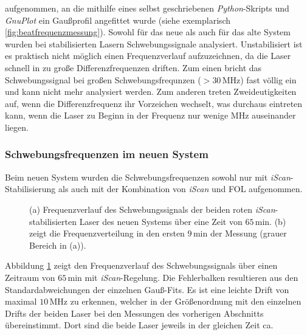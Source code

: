 aufgenommen, an die  mithilfe eines selbst geschriebenen \textit{Python}-Skripts
und \textit{GnuPlot} ein Gaußprofil angefittet wurde (siehe exemplarisch
\ref{fig:beatfrequenzmessung}).
Sowohl für das neue als auch für das alte System wurden bei stabilisierten
Lasern Schwebungssignale analysiert. Unstabilisiert ist es praktisch nicht
möglich einen Frequenzverlauf aufzuzeichnen, da die Laser schnell in zu
große Differenzfrequenzen driften. Zum einen bricht das Schwebungssignal
bei großen Schwebungsfrequnzen ($>30\,$MHz) fast völlig ein und kann nicht mehr
analysiert werden. Zum anderen treten Zweideutigkeiten auf, wenn die
Differenzfrequenz ihr Vorzeichen wechselt, was durchaus eintreten kann, wenn die
Laser zu Beginn in der Frequenz nur wenige MHz auseinander liegen.

\subsubsection{Schwebungsfrequenzen im neuen
System}\label{subsubsec:beatfrequenzmessung_neues_system}
Beim neuen System wurden die Schwebungsfrequenzen sowohl nur mit
\textit{iScan}-Stabilisierung als auch mit der Kombination von \textit{iScan}
und FOL aufgenommen.
\begin{figure}[hp]
 	\centering
 	\footnotesize
 	\fbox{\parbox{\dimexpr \linewidth - 2\fboxrule - 2\fboxsep}{
 	\subfloat[]{
		\label{subfig:beatfrequenzen_neu_iScan_drift}
		
		}\\
 	\subfloat[]{
		\label{subfig:beatfrequenzen_neu_iScan_histogramm}
		
		}
	}}
	\caption[Beatfrequenzen - neues System mit \textit{iScan}]{(a) Frequenzverlauf
	des Schwebungssignals der beiden roten \textit{iScan}-stabilisierten Laser des neuen Systems über eine Zeit von
	$65\,$min. (b) zeigt die Frequenzverteilung in den ersten $9\,$min der
	Messung (grauer Bereich in (a)).}
	\label{fig:beatfrequenzen_neu_iScan}
\end{figure}
Abbildung
\ref{fig:beatfrequenzen_neu_iScan} zeigt den Frequenzverlauf des Schwebungssignals über einen Zeitraum von $65\,$min mit
\textit{iScan}-Regelung. Die Fehlerbalken resultieren aus den
Standardabweichungen der einzelnen Gauß-Fits. Es ist eine leichte Drift von
maximal $10\,$MHz zu erkennen, welcher in der Größenordnung mit den
einzelnen Drifts der beiden Laser bei den Messungen des vorherigen Abschnitts
übereinstimmt. Dort sind die beide Laser jeweils in der gleichen Zeit ca.

